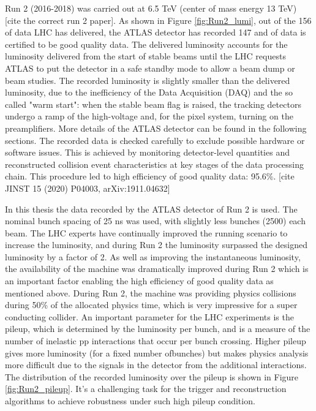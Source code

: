 \documentclass[letterpaper,12pt]{article}
\begin{document}
	Run 2 (2016-2018) was carried out
	at 6.5 TeV (center of mass energy 13 TeV) [cite the correct run  2 paper]. 
	As shown in Figure \ref{fig:Run2_lumi}, out of the 156 \fb of data LHC has delivered, the ATLAS detector has recorded 
	147 \fb and \lumi of data is certified to be good quality data.
	The delivered luminosity accounts for the luminosity delivered from the start of 
	stable beams until the LHC requests ATLAS to put the detector in a 
	safe standby mode to allow a beam dump or beam studies. 
	The recorded luminosity is slightly smaller than the delivered luminosity, due 
	to the inefficiency of the Data Acquisition (DAQ) and the so called "warm start": 
	when the stable beam flag is raised, 
	the tracking detectors undergo a ramp of the high-voltage and, 
	for the pixel system, turning on the preamplifiers. 
	More details of the ATLAS detector can be found in the following sections. 
	The recorded data is checked carefully to exclude possible hardware or software  issues. 
	This is achieved by monitoring detector-level quantities 
	and reconstructed collision event characteristics at key stages of the data processing chain.
	This procedure led to high efficiency of good quality data: 95.6\%.	[cite  JINST 15 (2020) P04003,  arXiv:1911.04632]

	In this thesis the \lumi data recorded by the ATLAS detector of Run 2 is used.
	The nominal bunch spacing of 25 ns was used, with slightly less bunches (2500) each beam.
	The LHC experts have continually improved the running scenario to increase the luminosity,
	and during Run 2 the luminosity surpassed the designed luminosity by a factor of 2. 
	As well as improving the instantaneous luminosity, the availability of the machine
	was dramatically improved during Run 2 which is an important factor enabling the high efficiency 
	of good quality data as mentioned above.
	During Run 2, the machine was providing physics collisions during 50\% of 
	the allocated physics time, which is very impressive for a super conducting collider. 
	An important parameter for the LHC experiments is the pileup, 
	which is determined by the luminosity per bunch, and is a measure of 
	the number of inelastic pp interactions that occur per bunch crossing. 
	Higher pileup gives more luminosity (for a fixed number ofbunches) 
	but makes physics analysis more difficult due to the signals in the detector 
	from the additional interactions. The distribution of the recorded luminosity over
	the pileup is shown in Figure \ref{fig:Run2_pileup}. It's a challenging task for the 
	trigger and reconstruction algorithms to achieve robustness under such high pileup 
	condition.
\end{document}

